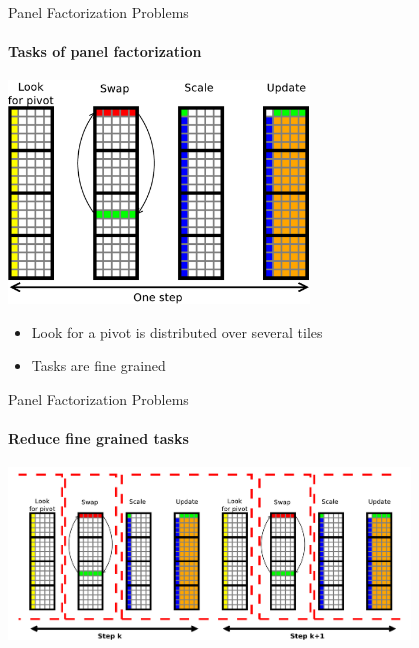 
\begin{frame}{Panel Factorization Problems}
\framesubtitle{Tasks of panel factorization}
\begin{center}
\includegraphics[width=0.6\textwidth]{panel_operation}
\end{center}
\begin{center}
\pause
\begin{itemize}
\item \alert{Look for a pivot is distributed over several tiles}
\item \alert{Tasks are fine grained}
\end{itemize}
\end{center}
\end{frame}

\begin{frame}{Panel Factorization Problems}
\framesubtitle{Reduce fine grained tasks}
\begin{center}
\includegraphics[width=0.8\textwidth]{merge}
\end{center}
\end{frame}


